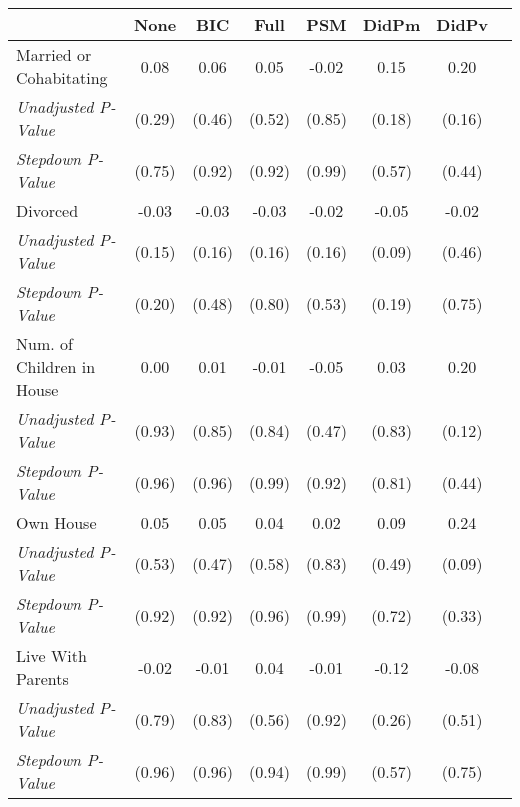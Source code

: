 \begin{tabular}{l c c c c c c c}
\toprule
 & None & BIC & Full & PSM & DidPm & DidPv \\
\midrule
Married or Cohabitating & 0.08 & 0.06 & 0.05 & -0.02 & 0.15 & 0.20 \\
\quad \textit{Unadjusted P-Value} & (0.29) & (0.46) & (0.52) & (0.85) & (0.18) & (0.16) \\
\quad \textit{Stepdown P-Value} & (0.75) & (0.92) & (0.92) & (0.99) & (0.57) & (0.44) \\
Divorced & -0.03 & -0.03 & -0.03 & -0.02 & -0.05 & -0.02 \\
\quad \textit{Unadjusted P-Value} & (0.15) & (0.16) & (0.16) & (0.16) & (0.09) & (0.46) \\
\quad \textit{Stepdown P-Value} & (0.20) & (0.48) & (0.80) & (0.53) & (0.19) & (0.75) \\
Num. of Children in House & 0.00 & 0.01 & -0.01 & -0.05 & 0.03 & 0.20 \\
\quad \textit{Unadjusted P-Value} & (0.93) & (0.85) & (0.84) & (0.47) & (0.83) & (0.12) \\
\quad \textit{Stepdown P-Value} & (0.96) & (0.96) & (0.99) & (0.92) & (0.81) & (0.44) \\
Own House & 0.05 & 0.05 & 0.04 & 0.02 & 0.09 & 0.24 \\
\quad \textit{Unadjusted P-Value} & (0.53) & (0.47) & (0.58) & (0.83) & (0.49) & (0.09) \\
\quad \textit{Stepdown P-Value} & (0.92) & (0.92) & (0.96) & (0.99) & (0.72) & (0.33) \\
Live With Parents & -0.02 & -0.01 & 0.04 & -0.01 & -0.12 & -0.08 \\
\quad \textit{Unadjusted P-Value} & (0.79) & (0.83) & (0.56) & (0.92) & (0.26) & (0.51) \\
\quad \textit{Stepdown P-Value} & (0.96) & (0.96) & (0.94) & (0.99) & (0.57) & (0.75) \\
\bottomrule
\end{tabular}
